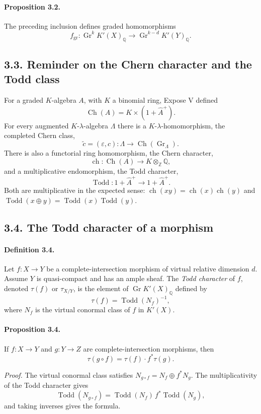 \documentclass[11pt]{article}
\theoremstyle{plain}
\theoremstyle{definition}
\theoremstyle{remark}
\newcommand{\QQ}{\mathbb Q}
\newcommand{\ZZ}{\mathbb Z}
\DeclareMathOperator{\Gr}{Gr}
\providecommand{\ch}{\operatorname{ch}}
\providecommand{\Todd}{\operatorname{Todd}}
\providecommand{\Ch}{\operatorname{Ch}}
\begin{document}
\paragraph{Proposition 3.2.} The preceding inclusion defines graded homomorphisms
\[
f_{\mathrm{gr}}:\Gr^kK'(X)_\QQ\longrightarrow\Gr^{k-d}K'(Y)_\QQ.
\]

\subsection*{3.3. Reminder on the Chern character and the Todd class}

For a graded $K$-algebra $A$, with $K$ a binomial ring, Expose V defined
\[
\Ch(A)=K\times(1+\widehat A^+).
\]
For every augmented $K$-$\lambda$-algebra $\Lambda$ there is a $K$-$\lambda$-homomorphism, the completed Chern class,
\[
\widetilde c=(\varepsilon,c):\Lambda\longrightarrow\Ch(\Gr_\Lambda).
\]
There is also a functorial ring homomorphism, the Chern character,
\[
\ch:\Ch(A)\longrightarrow K\otimes_\ZZ\QQ,
\]
and a multiplicative endomorphism, the Todd character,
\[
\Todd:1+\widehat A^+\longrightarrow1+\widehat A^+.
\]
Both are multiplicative in the expected sense: $\ch(xy)=\ch(x)\ch(y)$ and $\Todd(x\oplus y)=\Todd(x)\Todd(y)$.

\subsection*{3.4. The Todd character of a morphism}

\paragraph{Definition 3.4.} Let $f:X\to Y$ be a complete-intersection morphism of virtual relative dimension $d$. Assume $Y$ is quasi-compact and has an ample sheaf. The \emph{Todd character} of $f$, denoted $\tau(f)$ or $\tau_{X/Y}$, is the element of $\Gr K'(X)_\QQ$ defined by
\[
\tau(f)=\Todd(N_f)^{-1},
\]
where $N_f$ is the virtual conormal class of $f$ in $K'(X)$.

\paragraph{Proposition 3.4.} If $f:X\to Y$ and $g:Y\to Z$ are complete-intersection morphisms, then
\[
\tau(g\circ f)=\tau(f)\cdot f^*\tau(g).
\]

\emph{Proof.} The virtual conormal class satisfies $N_{g\circ f}=N_f\oplus f^*N_g$. The multiplicativity of the Todd character gives
\[
\Todd(N_{g\circ f})=\Todd(N_f)\,f^*\Todd(N_g),
\]
and taking inverses gives the formula.
\end{document}
